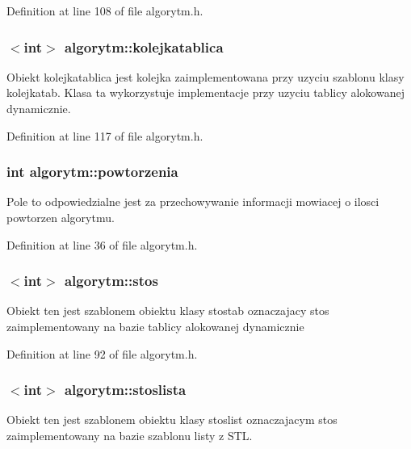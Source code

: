 Definition at line 108 of file algorytm.\-h.

\hypertarget{classalgorytm_aefc3de70ca1ac1bf1ff0598229ddb915}{
\subsubsection[{kolejkatablica}]{$<$int$>$ algorytm\-::kolejkatablica}}\label{classalgorytm_aefc3de70ca1ac1bf1ff0598229ddb915}
Obiekt kolejkatablica jest kolejka zaimplementowana przy uzyciu szablonu klasy kolejkatab. Klasa ta wykorzystuje implementacje przy uzyciu tablicy alokowanej dynamicznie. 

Definition at line 117 of file algorytm.\-h.

\hypertarget{classalgorytm_a6f208bf8705cfe407a3b7dea8b1e871c}{
\subsubsection[{powtorzenia}]{\setlength{\rightskip}{0pt plus 5cm}int algorytm\-::powtorzenia}}\label{classalgorytm_a6f208bf8705cfe407a3b7dea8b1e871c}
Pole to odpowiedzialne jest za przechowywanie informacji mowiacej o ilosci powtorzen algorytmu. 

Definition at line 36 of file algorytm.\-h.

\hypertarget{classalgorytm_a1829772ca4b928e0df0e4af2fcf907ca}{
\subsubsection[{stos}]{$<$int$>$ algorytm\-::stos}}\label{classalgorytm_a1829772ca4b928e0df0e4af2fcf907ca}
Obiekt ten jest szablonem obiektu klasy stostab oznaczajacy stos zaimplementowany na bazie tablicy alokowanej dynamicznie 

Definition at line 92 of file algorytm.\-h.

\hypertarget{classalgorytm_a334d547b11514cc290ea0395df44eda2}{
\subsubsection[{stoslista}]{$<$int$>$ algorytm\-::stoslista}}\label{classalgorytm_a334d547b11514cc290ea0395df44eda2}
Obiekt ten jest szablonem obiektu klasy stoslist oznaczajacym stos zaimplementowany na bazie szablonu listy z S\-T\-L. 

